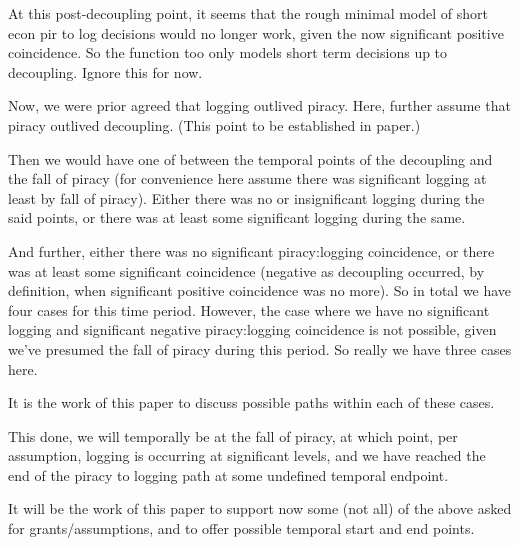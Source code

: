 \documentclass{amsart}
\theoremstyle{definition}%
\theoremstyle{definition}%
\theoremstyle{remark}%
\begin{document}
At this post-decoupling point, it seems that the rough minimal model of short econ pir to log decisions would no longer work, given the now significant positive coincidence. So the function too only models short term decisions up to decoupling. Ignore this for now.%

Now, we were prior agreed that logging outlived piracy. Here, further assume that piracy outlived decoupling. (This point to be established in paper.) 

Then we would have one of between the temporal points of the decoupling and the fall of piracy (for convenience here assume there was significant logging at least by fall of piracy). Either there was no or insignificant logging during the said points, or there was at least some significant logging during the same. %

And further, either there was no significant piracy:logging coincidence, or there was at least some significant coincidence (negative as decoupling occurred, by definition, when significant positive coincidence was no more). So in total we have four cases for this time period. %
However, the case where we have no significant logging and significant negative piracy:logging coincidence is not possible, given we've presumed the fall of piracy during this period. So really we have three cases here.

It is the work of this paper to discuss possible paths within each of these cases.

This done, we will temporally be at the fall of piracy, at which point, per assumption, logging is occurring at significant levels, and we have reached the end of the piracy to logging path at some undefined temporal endpoint.

It will be the work of this paper to support now some (not all) of the above asked for grants/assumptions, and to offer possible temporal start and end points.
%
\end{document}
